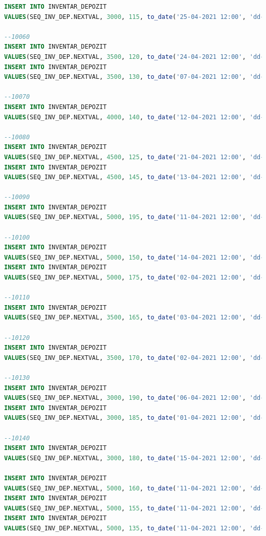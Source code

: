 \documentclass[12pt, a4paper]{article}
\begin{document}
\begin{lstlisting}[language=SQL]
INSERT INTO INVENTAR_DEPOZIT
VALUES(SEQ_INV_DEP.NEXTVAL, 3000, 115, to_date('25-04-2021 12:00', 'dd-mm-yyyy hh24:mi'), null);

--10060
INSERT INTO INVENTAR_DEPOZIT
VALUES(SEQ_INV_DEP.NEXTVAL, 3500, 120, to_date('24-04-2021 12:00', 'dd-mm-yyyy hh24:mi'), null);
INSERT INTO INVENTAR_DEPOZIT
VALUES(SEQ_INV_DEP.NEXTVAL, 3500, 130, to_date('07-04-2021 12:00', 'dd-mm-yyyy hh24:mi'), null);

--10070
INSERT INTO INVENTAR_DEPOZIT
VALUES(SEQ_INV_DEP.NEXTVAL, 4000, 140, to_date('12-04-2021 12:00', 'dd-mm-yyyy hh24:mi'), null);

--10080
INSERT INTO INVENTAR_DEPOZIT
VALUES(SEQ_INV_DEP.NEXTVAL, 4500, 125, to_date('21-04-2021 12:00', 'dd-mm-yyyy hh24:mi'), null);
INSERT INTO INVENTAR_DEPOZIT
VALUES(SEQ_INV_DEP.NEXTVAL, 4500, 145, to_date('13-04-2021 12:00', 'dd-mm-yyyy hh24:mi'), null);

--10090
INSERT INTO INVENTAR_DEPOZIT
VALUES(SEQ_INV_DEP.NEXTVAL, 5000, 195, to_date('11-04-2021 12:00', 'dd-mm-yyyy hh24:mi'), null);

--10100
INSERT INTO INVENTAR_DEPOZIT
VALUES(SEQ_INV_DEP.NEXTVAL, 5000, 150, to_date('14-04-2021 12:00', 'dd-mm-yyyy hh24:mi'), null);
INSERT INTO INVENTAR_DEPOZIT
VALUES(SEQ_INV_DEP.NEXTVAL, 5000, 175, to_date('02-04-2021 12:00', 'dd-mm-yyyy hh24:mi'), null);

--10110
INSERT INTO INVENTAR_DEPOZIT
VALUES(SEQ_INV_DEP.NEXTVAL, 3500, 165, to_date('03-04-2021 12:00', 'dd-mm-yyyy hh24:mi'), null);

--10120
INSERT INTO INVENTAR_DEPOZIT
VALUES(SEQ_INV_DEP.NEXTVAL, 3500, 170, to_date('02-04-2021 12:00', 'dd-mm-yyyy hh24:mi'), null);

--10130
INSERT INTO INVENTAR_DEPOZIT
VALUES(SEQ_INV_DEP.NEXTVAL, 3000, 190, to_date('06-04-2021 12:00', 'dd-mm-yyyy hh24:mi'), null);
INSERT INTO INVENTAR_DEPOZIT
VALUES(SEQ_INV_DEP.NEXTVAL, 3000, 185, to_date('01-04-2021 12:00', 'dd-mm-yyyy hh24:mi'), null);

--10140
INSERT INTO INVENTAR_DEPOZIT
VALUES(SEQ_INV_DEP.NEXTVAL, 3000, 180, to_date('15-04-2021 12:00', 'dd-mm-yyyy hh24:mi'), null);

INSERT INTO INVENTAR_DEPOZIT
VALUES(SEQ_INV_DEP.NEXTVAL, 5000, 160, to_date('11-04-2021 12:00', 'dd-mm-yyyy hh24:mi'), null);
INSERT INTO INVENTAR_DEPOZIT
VALUES(SEQ_INV_DEP.NEXTVAL, 5000, 155, to_date('11-04-2021 12:00', 'dd-mm-yyyy hh24:mi'), null);
INSERT INTO INVENTAR_DEPOZIT
VALUES(SEQ_INV_DEP.NEXTVAL, 5000, 135, to_date('11-04-2021 12:00', 'dd-mm-yyyy hh24:mi'), null);



\end{lstlisting}
\end{document}
